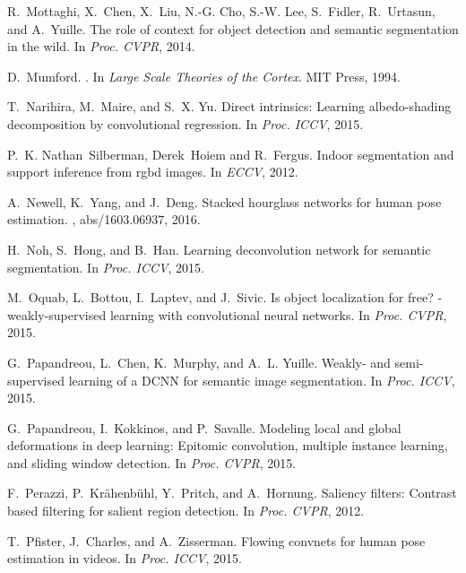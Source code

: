 \documentclass[10pt,twocolumn,letterpaper]{article}
\begin{document}
\begin{thebibliography}{100}
	R.~Mottaghi, X.~Chen, X.~Liu, N.-G. Cho, S.-W. Lee, S.~Fidler, R.~Urtasun, and
	A.~Yuille.
	\newblock The role of context for object detection and semantic segmentation in
	the wild.
	\newblock In {\em Proc. {CVPR}}, 2014.
	
	D.~Mumford.
	.
	\newblock In {\em Large Scale Theories of the Cortex}. MIT Press, 1994.
	
	T.~Narihira, M.~Maire, and S.~X. Yu.
	\newblock Direct intrinsics: Learning albedo-shading decomposition by
	convolutional regression.
	\newblock In {\em Proc. {ICCV}}, 2015.
	
	P.~K. Nathan~Silberman, Derek~Hoiem and R.~Fergus.
	\newblock Indoor segmentation and support inference from rgbd images.
	\newblock In {\em ECCV}, 2012.
	
	A.~Newell, K.~Yang, and J.~Deng.
	\newblock Stacked hourglass networks for human pose estimation.
	, abs/1603.06937, 2016.
	
	H.~Noh, S.~Hong, and B.~Han.
	\newblock Learning deconvolution network for semantic segmentation.
	\newblock In {\em Proc. {ICCV}}, 2015.
	
	M.~Oquab, L.~Bottou, I.~Laptev, and J.~Sivic.
	\newblock Is object localization for free? - weakly-supervised learning with
	convolutional neural networks.
	\newblock In {\em Proc. {CVPR}}, 2015.
	
	G.~Papandreou, L.~Chen, K.~Murphy, and A.~L. Yuille.
	\newblock Weakly- and semi-supervised learning of a {DCNN} for semantic image
	segmentation.
	\newblock In {\em Proc. {ICCV}}, 2015.
	
	G.~Papandreou, I.~Kokkinos, and P.~Savalle.
	\newblock Modeling local and global deformations in deep learning: Epitomic
	convolution, multiple instance learning, and sliding window detection.
	\newblock In {\em Proc. {CVPR}}, 2015.
	
	F.~Perazzi, P.~Kr{\"{a}}henb{\"{u}}hl, Y.~Pritch, and A.~Hornung.
	\newblock Saliency filters: Contrast based filtering for salient region
	detection.
	\newblock In {\em Proc. {CVPR}}, 2012.
	
	T.~Pfister, J.~Charles, and A.~Zisserman.
	\newblock Flowing convnets for human pose estimation in videos.
	\newblock In {\em Proc. {ICCV}}, 2015.
	

\end{thebibliography}
\end{document}
